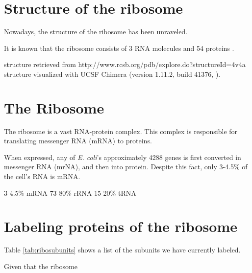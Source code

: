 

\section{Structure of the ribosome}

Nowadays, the structure of the ribosome has been unraveled.

It is known that the ribosome consists of 3 RNA molecules and 54 proteins \cite{Chen2013}.%

structure retrieved from
http://www.rcsb.org/pdb/explore.do?structureId=4v4a
structure visualized with UCSF Chimera (version 1.11.2, build 41376, \cite{pettersen2004}).



% 



\section{The Ribosome}





The ribosome is a vast RNA-protein complex. 
This complex is responsible for translating messenger RNA (mRNA) to proteins.


When expressed, any of \textit{E. coli}'s approximately 4288 genes \cite{Blattner1997} is first converted in messenger RNA (mrNA), and then into protein.
Despite this fact, only 3-4.5\% of the cell's RNA is mRNA.


3-4.5\% mRNA
73-80\% rRNA
15-20\% tRNA

\cite{Norris1972}


\section{Labeling proteins of the ribosome}

Table \ref{tab:ribosubunits} shows a list of the subunits we have currently labeled.

Given that the ribosome